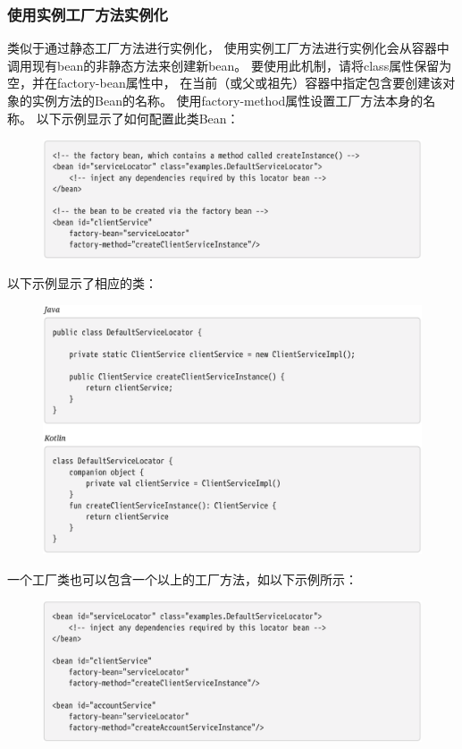 \subsubsection{使用实例工厂方法实例化}
类似于通过静态工厂方法进行实例化，
使用实例工厂方法进行实例化会从容器中调用现有bean的非静态方法来创建新bean。 
要使用此机制，请将class属性保留为空，并在factory-bean属性中，
在当前（或父或祖先）容器中指定包含要创建该对象的实例方法的Bean的名称。 
使用factory-method属性设置工厂方法本身的名称。 以下示例显示了如何配置此类Bean：

\begin{figure}[ht]
    \centering
    \includegraphics[width=1\linewidth]{./Figure/IMG_code_17.png}
\end{figure}

以下示例显示了相应的类：

\begin{figure}[ht]
    \centering
    \includegraphics[width=1\linewidth]{./Figure/IMG_code_18.png}
\end{figure}

\newpage
一个工厂类也可以包含一个以上的工厂方法，如以下示例所示：

\begin{figure}[ht]
    \centering
    \includegraphics[width=1\linewidth]{./Figure/IMG_code_19.png}
\end{figure}

